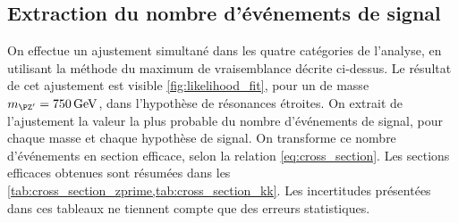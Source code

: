 \subsection{Extraction du nombre d'événements de signal}

On effectue un ajustement simultané dans les quatre catégories de l'analyse, en utilisant la méthode du maximum de vraisemblance décrite ci-dessus. Le résultat de cet ajustement est visible \cref{fig:likelihood_fit}, pour un \zprime de masse $\mzp = \SI{750}{\GeV}$, dans l'hypothèse de résonances étroites. On extrait de l'ajustement la valeur la plus probable du nombre d'événements de signal, pour chaque masse et chaque hypothèse de signal. On transforme ce nombre d'événements en section efficace, selon la relation \ref{eq:cross_section}. Les sections efficaces obtenues sont résumées dans les \cref{tab:cross_section_zprime,tab:cross_section_kk}. Les incertitudes présentées dans ces tableaux ne tiennent compte que des erreurs statistiques.

